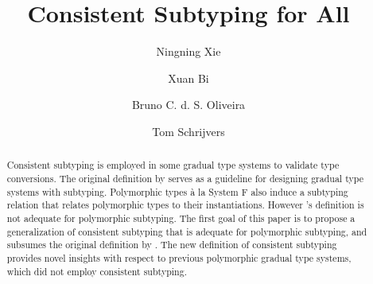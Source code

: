 \documentclass[format=acmsmall, review=false, screen=true]{acmart}
\begin{document}

\title{Consistent Subtyping for All}


\author{Ningning Xie}
\author{Xuan Bi}
\author{Bruno C. d. S. Oliveira}
\author{Tom Schrijvers}




\begin{abstract}
  Consistent subtyping is employed in some gradual type systems to validate type
  conversions. The original definition by \citeauthor{siek2007gradual} serves as a guideline for designing gradual type
  systems with subtyping. Polymorphic types \`a la System F also induce a
  subtyping relation that relates polymorphic types to their instantiations.
  However \citeauthor{siek2007gradual}'s definition is not adequate for
  polymorphic subtyping.
The first goal of this paper is to propose a generalization of consistent
subtyping that is adequate for polymorphic subtyping, and subsumes the original
definition by \citeauthor{siek2007gradual}. The new definition of consistent
subtyping provides novel insights with respect to previous polymorphic gradual
type systems, which did not employ consistent subtyping.

\end{abstract}
\end{document}
